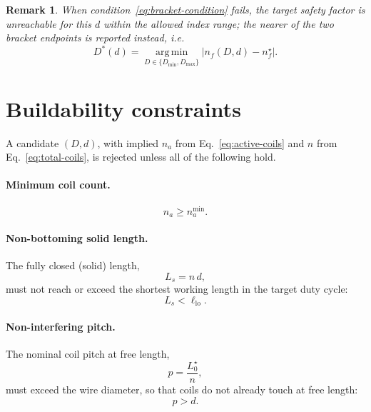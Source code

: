 \documentclass[11pt]{article}
\newtheorem{remark}{Remark}
\begin{document}
\begin{remark}
When condition~\eqref{eq:bracket-condition} fails, the target safety
factor is unreachable for this $d$ within the allowed index range; the
nearer of the two bracket endpoints is reported instead, i.e.
\begin{equation}
D^{*}(d) = \operatorname*{arg\,min}_{D\in\{D_{\min},D_{\max}\}}
\big|n_f(D,d) - n_f^{\star}\big| .
\end{equation}
\end{remark}

\section{Buildability constraints}
\label{sec:constraints}

A candidate $(D,d)$, with implied $n_a$ from Eq.~\eqref{eq:active-coils}
and $n$ from Eq.~\eqref{eq:total-coils}, is rejected unless all of the
following hold.

\paragraph{Minimum coil count.}
\begin{equation}
n_a \ge n_a^{\min}.
\label{eq:min-coils}
\end{equation}

\paragraph{Non-bottoming solid length.}
The fully closed (solid) length,
\begin{equation}
L_s = n\,d,
\label{eq:solid-length-inv}
\end{equation}
must not reach or exceed the shortest working length in the target
duty cycle:
\begin{equation}
L_s < \ell_{\mathrm{lo}}.
\label{eq:no-bottom}
\end{equation}

\paragraph{Non-interfering pitch.}
The nominal coil pitch at free length,
\begin{equation}
p = \frac{L_0^{\star}}{n},
\label{eq:pitch}
\end{equation}
must exceed the wire diameter, so that coils do not already touch at
free length:
\begin{equation}
p > d.
\label{eq:pitch-constraint}
\end{equation}
\end{document}
